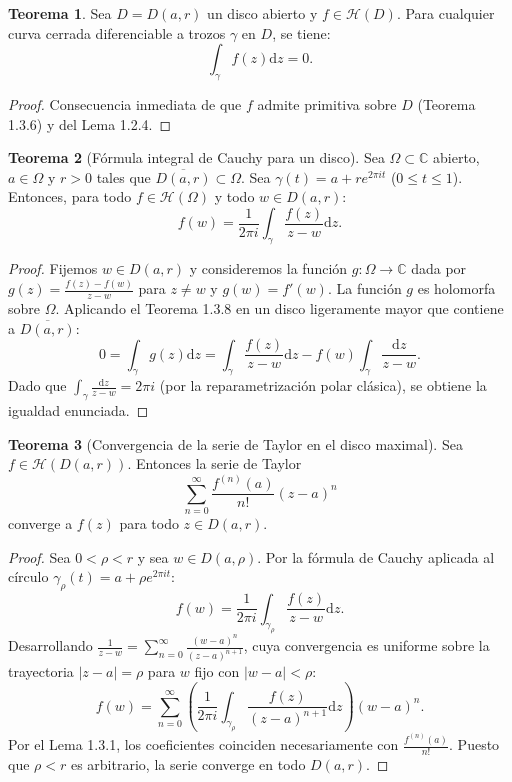 \documentclass[11pt,a4paper]{article}
\theoremstyle{definition}
\newtheorem{teorema}{Teorema}[section]
\theoremstyle{remark}
\numberwithin{equation}{section}
\newcommand{\dz}{\mathrm{d}z}
\begin{document}
\begin{teorema}
Sea $D = D(a,r)$ un disco abierto y $f \in \mathcal{H}(D)$. Para cualquier curva cerrada diferenciable a trozos $\gamma$ en $D$, se tiene:
\begin{equation}
\int_\gamma f(z) \dz = 0.
\end{equation}
\end{teorema}
\begin{proof}
Consecuencia inmediata de que $f$ admite primitiva sobre $D$ (Teorema 1.3.6) y del Lema 1.2.4.
\end{proof}

\begin{teorema}[Fórmula integral de Cauchy para un disco]
Sea $\Omega \subset \mathbb{C}$ abierto, $a \in \Omega$ y $r > 0$ tales que $\overline{D(a,r)} \subset \Omega$. Sea $\gamma(t) = a + r e^{2\pi i t}$ ($0 \le t \le 1$). Entonces, para todo $f \in \mathcal{H}(\Omega)$ y todo $w \in D(a,r)$:
\begin{equation}
f(w) = \frac{1}{2\pi i} \int_\gamma \frac{f(z)}{z-w} \dz.
\end{equation}
\end{teorema}
\begin{proof}
Fijemos $w \in D(a,r)$ y consideremos la función $g: \Omega \to \mathbb{C}$ dada por $g(z) = \frac{f(z)-f(w)}{z-w}$ para $z \neq w$ y $g(w) = f'(w)$. La función $g$ es holomorfa sobre $\Omega$. Aplicando el Teorema 1.3.8 en un disco ligeramente mayor que contiene a $\overline{D(a,r)}$:
\[
0 = \int_\gamma g(z) \dz = \int_\gamma \frac{f(z)}{z-w} \dz - f(w) \int_\gamma \frac{\dz}{z-w}.
\]
Dado que $\int_\gamma \frac{\dz}{z-w} = 2\pi i$ (por la reparametrización polar clásica), se obtiene la igualdad enunciada.
\end{proof}

\begin{teorema}[Convergencia de la serie de Taylor en el disco maximal]
Sea $f \in \mathcal{H}(D(a,r))$. Entonces la serie de Taylor
\begin{equation}
\sum_{n=0}^\infty \frac{f^{(n)}(a)}{n!} (z-a)^n
\end{equation}
converge a $f(z)$ para todo $z \in D(a,r)$.
\end{teorema}
\begin{proof}
Sea $0 < \rho < r$ y sea $w \in D(a,\rho)$. Por la fórmula de Cauchy aplicada al círculo $\gamma_\rho(t) = a + \rho e^{2\pi i t}$:
\[
f(w) = \frac{1}{2\pi i} \int_{\gamma_\rho} \frac{f(z)}{z-w} \dz.
\]
Desarrollando $\frac{1}{z-w} = \sum_{n=0}^\infty \frac{(w-a)^n}{(z-a)^{n+1}}$, cuya convergencia es uniforme sobre la trayectoria $|z-a|=\rho$ para $w$ fijo con $|w-a| < \rho$:
\[
f(w) = \sum_{n=0}^\infty \left( \frac{1}{2\pi i} \int_{\gamma_\rho} \frac{f(z)}{(z-a)^{n+1}} \dz \right) (w-a)^n.
\]
Por el Lema 1.3.1, los coeficientes coinciden necesariamente con $\frac{f^{(n)}(a)}{n!}$. Puesto que $\rho < r$ es arbitrario, la serie converge en todo $D(a,r)$.
\end{proof}
\end{document}
